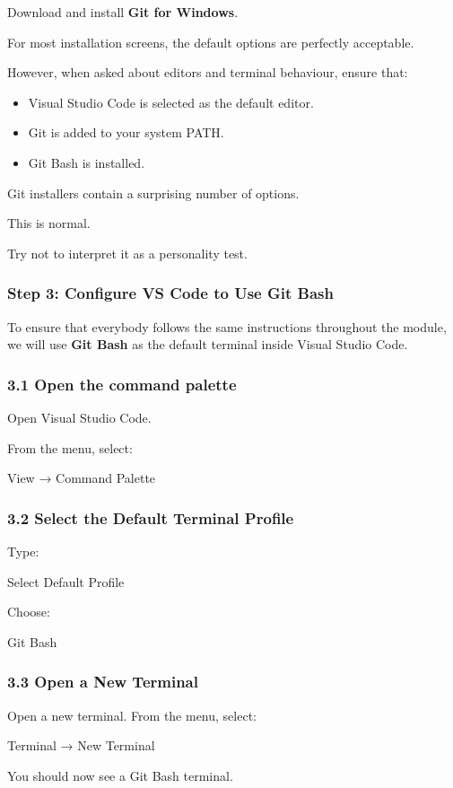 \documentclass{csc2059practical}
\begin{document}
Download and install \textbf{Git for Windows}.

For most installation screens, the default options are perfectly acceptable.

However, when asked about editors and terminal behaviour, ensure that:

\begin{itemize}
  \item Visual Studio Code is selected as the default editor.
  \item Git is added to your system PATH.
  \item Git Bash is installed.
\end{itemize}
Git installers contain a surprising number of options.

This is normal.

Try not to interpret it as a personality test.

\subsubsection{Step 3: Configure VS Code to Use Git Bash}
To ensure that everybody follows the same instructions throughout the module, we will use \textbf{Git Bash} as the default terminal inside Visual Studio Code.

\subsubsection{3.1 Open the command palette}
Open Visual Studio Code.

From the menu, select:

View → Command Palette

\subsubsection{3.2 Select the Default Terminal Profile}
Type:

Select Default Profile

Choose:

Git Bash

\subsubsection{3.3 Open a New Terminal}
Open a new terminal. From the menu, select:

Terminal → New Terminal

You should now see a Git Bash terminal.
\end{document}
